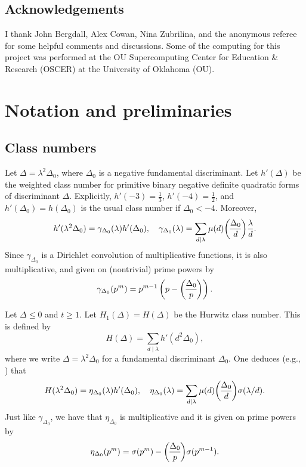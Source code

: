 \documentclass[11pt]{amsart}
\newcommand{\leg}{\overwithdelims ()}
\numberwithin{lem}{section}
\theoremstyle{remark}
\theoremstyle{definition}
\numberwithin{equation}{section}
\begin{document}
\subsection*{Acknowledgements}
I thank John Bergdall, Alex Cowan, Nina Zubrilina, and the anonymous referee for some helpful comments and discussions.
Some of the computing for this project was performed at the OU Supercomputing Center for Education \& Research (OSCER) at the University of Oklahoma (OU). 


\section{Notation and preliminaries}


\subsection{Class numbers}

Let $\Delta = \lambda^2 \Delta_0$, where $\Delta_0$ is a negative fundamental discriminant.  Let $h'(\Delta)$ be the weighted class number for primitive binary negative definite quadratic forms of discriminant $\Delta$.  Explicitly, $h'(-3) = \frac 13$, $h'(-4) = \frac 12$, and $h'(\Delta_0) = h(\Delta_0)$ is the usual class number if $\Delta_0 < -4$.
Moreover, 
\begin{equation} h'(\lambda^2 \Delta_0) = \gamma_{\Delta_0}(\lambda) h'(\Delta_0),
\quad \gamma_{\Delta_0}(\lambda) = \sum_{d \mid \lambda} \mu(d) {\Delta_0 \leg d} \frac \lambda d.
\end{equation}
Since $\gamma_{\Delta_0}$ is a Dirichlet convolution of multiplicative functions, it is also multiplicative, and given on (nontrivial) prime powers by
\[ \gamma_{\Delta_0}(p^m) = 
p^{m-1} \left( p - {\Delta_0 \leg p} \right). \]

Let $\Delta \le 0$ and $t \ge 1$.  Let $H_1(\Delta) = H(\Delta)$ be the Hurwitz class number.  This is defined by
\[ H(\Delta) = \sum_{d \mid \lambda} h'(d^2 \Delta_0), \]
where we write $\Delta = \lambda^2 \Delta_0$ for a fundamental discriminant $\Delta_0$.
One deduces (e.g., \cite[(2.3)]{me:rootno}) that
\begin{equation} \label{eq:Hlambda2}
 H(\lambda^2 \Delta_0) =  \eta_{\Delta_0}(\lambda) h'(\Delta_0), \quad
\eta_{\Delta_0}(\lambda) = \sum_{d \mid \lambda} \mu(d) {\Delta_0 \leg d} \sigma(\lambda/d).
\end{equation}
Just like $\gamma_{\Delta_0}$, we have that $\eta_{\Delta_0}$ is multiplicative and it is given on prime powers by
\[ \eta_{\Delta_0}(p^m) = 
 \sigma(p^m) - {\Delta_0 \leg p} \sigma(p^{m-1}). \]
\end{document}
